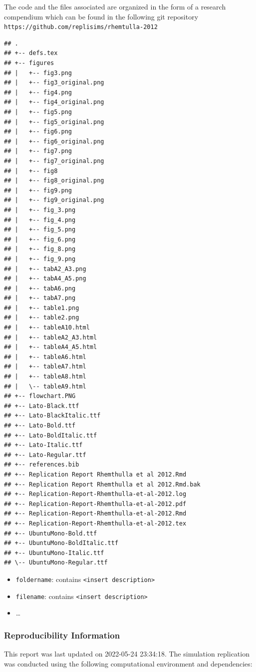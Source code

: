 \documentclass[10,a4paperpaper,]{article}
\begin{document}
The code and the files associated are organized in the form of a
research compendium which can be found in the following git repository
\texttt{https://github.com/replisims/rhemtulla-2012}

\begin{verbatim}
## .
## +-- defs.tex
## +-- figures
## |   +-- fig3.png
## |   +-- fig3_original.png
## |   +-- fig4.png
## |   +-- fig4_original.png
## |   +-- fig5.png
## |   +-- fig5_original.png
## |   +-- fig6.png
## |   +-- fig6_original.png
## |   +-- fig7.png
## |   +-- fig7_original.png
## |   +-- fig8
## |   +-- fig8_original.png
## |   +-- fig9.png
## |   +-- fig9_original.png
## |   +-- fig_3.png
## |   +-- fig_4.png
## |   +-- fig_5.png
## |   +-- fig_6.png
## |   +-- fig_8.png
## |   +-- fig_9.png
## |   +-- tabA2_A3.png
## |   +-- tabA4_A5.png
## |   +-- tabA6.png
## |   +-- tabA7.png
## |   +-- table1.png
## |   +-- table2.png
## |   +-- tableA10.html
## |   +-- tableA2_A3.html
## |   +-- tableA4_A5.html
## |   +-- tableA6.html
## |   +-- tableA7.html
## |   +-- tableA8.html
## |   \-- tableA9.html
## +-- flowchart.PNG
## +-- Lato-Black.ttf
## +-- Lato-BlackItalic.ttf
## +-- Lato-Bold.ttf
## +-- Lato-BoldItalic.ttf
## +-- Lato-Italic.ttf
## +-- Lato-Regular.ttf
## +-- references.bib
## +-- Replication Report Rhemthulla et al 2012.Rmd
## +-- Replication Report Rhemthulla et al 2012.Rmd.bak
## +-- Replication-Report-Rhemthulla-et-al-2012.log
## +-- Replication-Report-Rhemthulla-et-al-2012.pdf
## +-- Replication-Report-Rhemthulla-et-al-2012.Rmd
## +-- Replication-Report-Rhemthulla-et-al-2012.tex
## +-- UbuntuMono-Bold.ttf
## +-- UbuntuMono-BoldItalic.ttf
## +-- UbuntuMono-Italic.ttf
## \-- UbuntuMono-Regular.ttf
\end{verbatim}

\begin{itemize}
\tightlist
\item
  \texttt{foldername}: contains
  \texttt{\textless{}insert\ description\textgreater{}}
\item
  \texttt{filename}: contains
  \texttt{\textless{}insert\ description\textgreater{}}
\item
  \ldots{}
\end{itemize}

\subsubsection*{Reproducibility Information}

This report was last updated on 2022-05-24 23:34:18. The simulation
replication was conducted using the following computational environment
and dependencies:
\end{document}
